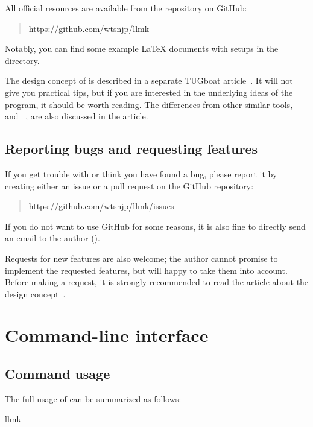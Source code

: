 \documentclass{llmk-doc}
\begin{document}
\begin{samepage}
All official resources are available from the repository on GitHub:
%
\begin{quote}
\url{https://github.com/wtsnjp/llmk}
\end{quote}
%
Notably, you can find some example {\LaTeX} documents with  setups
in the \href{https://github.com/wtsnjp/llmk/tree/master/examples}
{} directory.
\end{samepage}

The design concept of  is described in a separate TUGboat
article~\cite{asakura2020}. It will not give you practical tips, but if you are
interested in the underlying ideas of the program, it should be worth reading.
The differences from other similar tools, \eg{}~\cite{latexmk} and
~\cite{arara}, are also discussed in the article.

\subsection{Reporting bugs and requesting features}

If you get trouble with  or think you have found a bug, please
report it by creating either an issue or a pull request on the GitHub
repository:
%
\begin{quote}
\url{https://github.com/wtsnjp/llmk/issues}
\end{quote}
%
If you do not want to use GitHub for some reasons, it is also fine to directly
send an email to the author ().

Requests for new features are also welcome; the author cannot promise to
implement the requested features, but will happy to take them into account.
Before making a request, it is strongly recommended to read the article about
the design concept~\cite{asakura2020}.

\section{Command-line interface}

\subsection{Command usage}
\label{sec:command}

The full usage of  can be summarized as follows:
%
\begin{htcode}
llmk  
\end{htcode}
\end{document}
